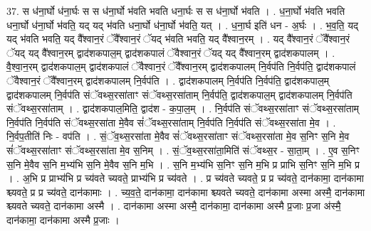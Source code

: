 \documentclass[17pt]{extarticle}
\begin{document}
37. स ध॑ना॒र्घो ध॑ना॒र्घः स स ध॑ना॒र्घो भ॑वति भवति धना॒र्घः स स ध॑ना॒र्घो भ॑वति । . ध॒ना॒र्घो भ॑वति भवति धना॒र्घो ध॑ना॒र्घो भ॑वति॒ यद् यद् भ॑वति धना॒र्घो ध॑ना॒र्घो भ॑वति॒ यत् । . ध॒ना॒र्घ इति॑ धन - अ॒र्घः । . भ॒व॒ति॒ यद् यद् भ॑वति भवति॒ यद् वै᳚श्वान॒रं ॅवै᳚श्वान॒रं ॅयद् भ॑वति भवति॒ यद् वै᳚श्वान॒रम् । . यद् वै᳚श्वान॒रं ॅवै᳚श्वान॒रं ॅयद् यद् वै᳚श्वान॒रम् द्वाद॑शकपाल॒म् द्वाद॑शकपालं ॅवैश्वान॒रं ॅयद् यद् वै᳚श्वान॒रम् द्वाद॑शकपालम् । . वै॒श्वा॒न॒रम् द्वाद॑शकपाल॒म् द्वाद॑शकपालं ॅवैश्वान॒रं ॅवै᳚श्वान॒रम् द्वाद॑शकपालम् नि॒र्वप॑ति नि॒र्वप॑ति॒ द्वाद॑शकपालं ॅवैश्वान॒रं ॅवै᳚श्वान॒रम् द्वाद॑शकपालम् नि॒र्वप॑ति । . द्वाद॑शकपालम् नि॒र्वप॑ति नि॒र्वप॑ति॒ द्वाद॑शकपाल॒म् द्वाद॑शकपालम् नि॒र्वप॑ति संॅवथ्स॒रसा॑ताꣳ संॅवथ्स॒रसा॑ताम् नि॒र्वप॑ति॒ द्वाद॑शकपाल॒म् द्वाद॑शकपालम् नि॒र्वप॑ति संॅवथ्स॒रसा॑ताम् । . द्वाद॑शकपाल॒मिति॒ द्वाद॑श - क॒पा॒ल॒म् । . नि॒र्वप॑ति संॅवथ्स॒रसा॑ताꣳ संॅवथ्स॒रसा॑ताम् नि॒र्वप॑ति नि॒र्वप॑ति संॅवथ्स॒रसा॑ता मे॒वैव सं॑ॅवथ्स॒रसा॑ताम् नि॒र्वप॑ति नि॒र्वप॑ति संॅवथ्स॒रसा॑ता मे॒व । . नि॒र्वप॒तीति॑ निः - वप॑ति । . सं॒ॅव॒थ्स॒रसा॑ता मे॒वैव सं॑ॅवथ्स॒रसा॑ताꣳ संॅवथ्स॒रसा॑ता मे॒व स॒निꣳ स॒नि मे॒व सं॑ॅवथ्स॒रसा॑ताꣳ संॅवथ्स॒रसा॑ता मे॒व स॒निम् । . सं॒ॅव॒थ्स॒रसा॑ता॒मिति॑ संॅवथ्स॒र - सा॒ता॒म् । . ए॒व स॒निꣳ स॒नि मे॒वैव स॒नि म॒भ्य॑भि स॒नि मे॒वैव स॒नि म॒भि । . स॒नि म॒भ्य॑भि स॒निꣳ स॒नि म॒भि प्र प्राभि स॒निꣳ स॒नि म॒भि प्र । . अ॒भि प्र प्राभ्य॑भि प्र च्य॑वते च्यवते॒ प्राभ्य॑भि प्र च्य॑वते । . प्र च्य॑वते च्यवते॒ प्र प्र च्य॑वते॒ दान॑कामा॒ दान॑कामा श्च्यवते॒ प्र प्र च्य॑वते॒ दान॑कामाः । . च्य॒व॒ते॒ दान॑कामा॒ दान॑कामा श्च्यवते च्यवते॒ दान॑कामा अस्मा अस्मै॒ दान॑कामा श्च्यवते च्यवते॒ दान॑कामा अस्मै । . दान॑कामा अस्मा अस्मै॒ दान॑कामा॒ दान॑कामा अस्मै प्र॒जाः प्र॒जा अ॑स्मै॒ दान॑कामा॒ दान॑कामा अस्मै प्र॒जाः । \newline
\end{document}
